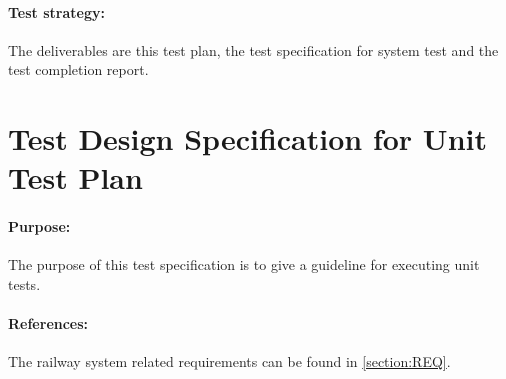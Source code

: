 \paragraph{Test strategy:} The deliverables are this test plan, the test specification for system test and the test completion report.


\section{Test Design Specification for Unit Test Plan}

\paragraph{Purpose:} The purpose of this test specification is to give a guideline for executing unit tests.
\paragraph{References:} The railway system related requirements can be found in \autoref{section:REQ}.

